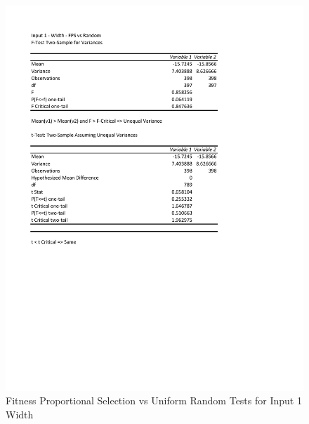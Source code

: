 \documentclass[times]{article}
\begin{document}
	\begin{figure}
		\caption{Fitness Proportional Selection vs Uniform Random Tests for Input 1 Width}
		\label{fig:1parent3_moea}
		\includegraphics[width=\textwidth]{./t_test/1_parent3_moea.pdf}
	\end{figure}
\end{document}

